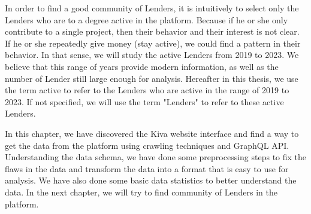 In order to find a good community of Lenders,
it is intuitively to select only the Lenders who are to a degree active in the platform.
Because if he or she only contribute to a single project,
then their behavior and their interest is not clear.
If he or she repeatedly give money (stay active),
we could find a pattern in their behavior.
In that sense, we will study the active Lenders from 2019 to 2023.
We believe that this range of years provide modern information,
as well as the number of Lender still large enough for analysis.
Hereafter in this thesis,
we use the term \gls{active} to refer to the Lenders who are active in the range of 2019 to 2023.
If not specified, we will use the term "Lenders" to refer to these active Lenders.

In this chapter, we have discovered the Kiva website interface
and find a way to get the data from the platform using crawling techniques and GraphQL API.
Understanding the data schema, we have done some preprocessing steps to
fix the flaws in the data and transform the data into a format that is easy to use for analysis.
We have also done some basic data statistics to better understand the data.
In the next chapter, we will try to find community of Lenders in the platform.
